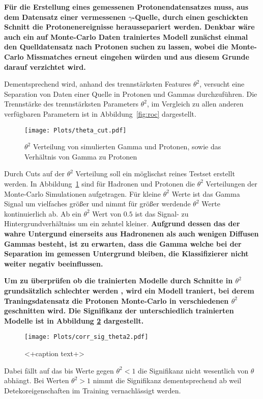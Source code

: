 \textbf{Für die Erstellung eines gemessenen Protonendatensatzes muss, aus dem Datensatz einer vermessenen $\gamma$-Quelle, durch einen geschickten Schnitt die Protonenereignisse heraussepariert werden. 
Denkbar wäre auch ein auf Monte-Carlo Daten trainiertes Modell zunächst einmal den Quelldatensatz nach Protonen suchen zu lassen, wobei die Monte-Carlo Missmatches erneut eingehen würden und aus diesem Grunde darauf verzichtet wird.}

Dementsprechend wird, anhand des trennstärksten Features $\theta^{2}$, versucht eine Separation von Daten einer Quelle in Protonen und Gammas durchzuführen. 
Die Trennstärke des trennstärksten Parameters $\theta^{2}$, im Vergleich zu allen anderen verfügbaren Parametern ist in Abbildung~\ref{fig:roc} dargestellt. 
\begin{figure}[H]
  \centering
  \texttt{[image: Plots/theta\_cut.pdf]}
  \caption{$\theta^{2}$ Verteilung von simulierten Gamma und Protonen, sowie das Verhältnis von Gamma zu Protonen}
  \label{fig:thetacut}
\end{figure}
Durch Cuts auf der $\theta^{2}$ Verteilung soll ein möglischst reines Testset erstellt werden. 
In Abbildung~\ref{fig:thetacut} sind für Hadronen und Protonen die $\theta^{2}$ Verteilungen der Monte-Carlo Simulationen aufgetragen. 
Für kleine $\theta^{2}$ Werte ist das Gamma Signal um vielfaches größer und nimmt für größer werdende $\theta^{2}$ Werte kontinuierlich ab. 
Ab ein $\theta^{2}$ Wert von $0.5$ ist das Signal- zu Hintergrundverhältniss um ein zehntel kleiner.
\textbf{Aufgrund dessen das der wahre Untergund einerseits aus Hadronenen als auch wenigen Diffusen Gammas besteht, ist zu erwarten, dass die Gamma welche bei der Separation im gemessen Untergrund bleiben, die Klassifizierer nicht weiter negativ beeinflussen.}

\textbf{Um zu überprüfen ob die trainierten Modelle durch Schnitte in $\theta^{2}$ grundsätzlich schlechter werden , wird ein Modell traniert, bei derem Traningsdatensatz die Protonen Monte-Carlo in verschiedenen $\theta^{2}$ geschnitten wird. 
Die Signifikanz der unterschiedlich trainierten Modelle ist in Abbildung \ref{fig:corrtheta} dargestellt.}
\begin{figure}[H]
  \centering
  \texttt{[image: Plots/corr\_sig\_theta2.pdf]}
  \caption{<+caption text+>}
  \label{fig:corrtheta}
\end{figure}
Dabei fällt auf das bis Werte gegen $\theta^{2} < 1$ die Signifikanz nicht wesentlich von $\theta$ abhängt. Bei Werten $\theta^{2} > 1$ nimmt die Signifikanz dementsprechend ab weil Detekoreigenschaften im Training vernachlässigt werden.

